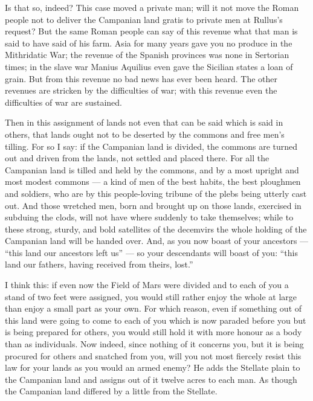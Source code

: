  Is that so, indeed? This case moved a private man; will it not move the Roman people not to deliver the Campanian land gratis to private men at Rullus's request? But the same Roman people can say of this revenue what that man is said to have said of his farm. Asia for many years gave you no produce in the Mithridatic War; the revenue of the Spanish provinces was none in Sertorian times; in the slave war Manius Aquilius even gave the Sicilian states a loan of grain. But from this revenue no bad news has ever been heard. The other revenues are stricken by the difficulties of war; with this revenue even the difficulties of war are sustained.

 Then in this assignment of lands not even that can be said which is said in others, that lands ought not to be deserted by the commons and free men's tilling. For so I say: if the Campanian land is divided, the commons are turned out and driven from the lands, not settled and placed there. For all the Campanian land is tilled and held by the commons, and by a most upright and most modest commons --- a kind of men of the best habits, the best ploughmen and soldiers, who are by this people-loving tribune of the plebs being utterly cast out. And those wretched men, born and brought up on those lands, exercised in subduing the clods, will not have where suddenly to take themselves; while to these strong, sturdy, and bold satellites of the decemvirs the whole holding of the Campanian land will be handed over. And, as you now boast of your ancestors --- ``this land our ancestors left us'' --- so your descendants will boast of you: ``this land our fathers, having received from theirs, lost.''

 I think this: if even now the Field of Mars were divided and to each of you a stand of two feet were assigned, you would still rather enjoy the whole at large than enjoy a small part as your own. For which reason, even if something out of this land were going to come to each of you which is now paraded before you but is being prepared for others, you would still hold it with more honour as a body than as individuals. Now indeed, since nothing of it concerns you, but it is being procured for others and snatched from you, will you not most fiercely resist this law for your lands as you would an armed enemy? He adds the Stellate plain to the Campanian land and assigns out of it twelve acres to each man. As though the Campanian land differed by a little from the Stellate.

